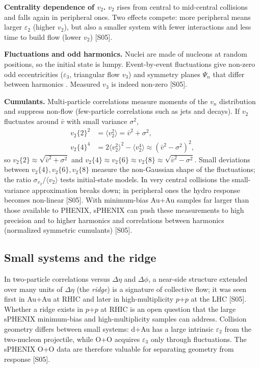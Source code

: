 \documentclass[11pt,letterpaper]{article}
\begin{document}
\textbf{Centrality dependence of $v_2$.} $v_2$ rises from central to mid-central collisions and falls again in
peripheral ones. Two effects compete: more peripheral means larger $\varepsilon_2$ (higher $v_2$), but also a smaller
system with fewer interactions and less time to build flow (lower $v_2$) [S05].

\textbf{Fluctuations and odd harmonics.} Nuclei are made of nucleons at random positions, so the initial state is
lumpy. Event-by-event fluctuations give non-zero odd eccentricities ($\varepsilon_3$, triangular flow $v_3$) and
symmetry planes $\Psi_n$ that differ between harmonics \cite{alverroland}. Measured $v_3$ is indeed non-zero [S05].

\textbf{Cumulants.} Multi-particle correlations measure moments of the $v_n$ distribution and suppress non-flow
(few-particle correlations such as jets and decays). If $v_2$ fluctuates around $\bar v$ with small variance $\sigma^2$,
\begin{align}
v_2\{2\}^2&=\langle v_2^2\rangle=\bar v^2+\sigma^2,\\
v_2\{4\}^4&=2\langle v_2^2\rangle^2-\langle v_2^4\rangle\approx(\bar v^2-\sigma^2)^2,
\end{align}
so $v_2\{2\}\approx\sqrt{\bar v^2+\sigma^2}$ and $v_2\{4\}\approx v_2\{6\}\approx v_2\{8\}\approx\sqrt{\bar v^2-\sigma^2}$.
Small deviations between $v_2\{4\},v_2\{6\},v_2\{8\}$ measure the non-Gaussian shape of the fluctuations; the ratio
$\sigma_{v_2}/\langle v_2\rangle$ tests initial-state models. In very central collisions the small-variance
approximation breaks down; in peripheral ones the hydro response becomes non-linear [S05]. With minimum-bias Au+Au samples far larger than those available to PHENIX, sPHENIX can push these measurements to high precision and to higher harmonics and
correlations between harmonics (normalized symmetric cumulants) [S05].

\subsection{Small systems and the ridge}
In two-particle correlations versus $\Delta\eta$ and $\Delta\phi$, a near-side structure extended over many units of
$\Delta\eta$ (the \emph{ridge}) is a signature of collective flow; it was seen first in Au+Au at RHIC and later in
high-multiplicity $p$+$p$ at the LHC [S05]. Whether a ridge exists in $p$+$p$ at RHIC is an open question that the
large sPHENIX minimum-bias and high-multiplicity samples can address. Collision geometry differs between small systems:
d+Au has a large intrinsic $\varepsilon_2$ from the two-nucleon projectile, while O+O acquires $\varepsilon_3$ only
through fluctuations. The sPHENIX O+O data are therefore valuable for separating geometry from response [S05].
\end{document}
